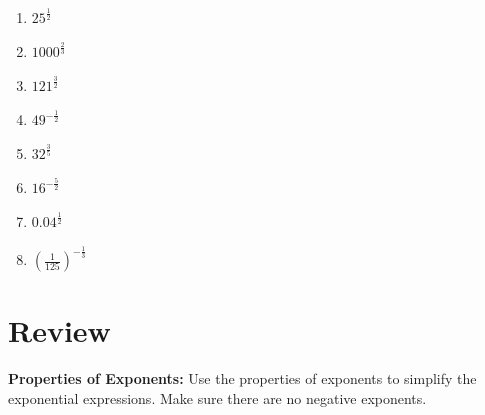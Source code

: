 \documentclass[12pt]{article}
\begin{document}
\begin{multicols}{2}
\begin{enumerate}
		\setlength\itemsep{1cm}

\item $25^{\frac{1}{2}}$\\

\item $1000^{\frac{2}{3}}$\\

\item $121^{\frac{3}{2}}$\\

\item $49^{-\frac{1}{2}}$\\

\item  $32^{\frac{3}{5}}$\\

\item $16^{-\frac{5}{2}}$\\

\item $0.04^{\frac{1}{2}}$\\

\item $\left(\frac{1}{125}\right)^{-\frac{1}{3}}$

\end{enumerate}
\end{multicols}

\pagebreak


\section{Review}

\textbf{Properties of Exponents:} Use the properties of exponents to simplify the exponential expressions. Make sure there are no negative exponents.\\
\end{document}
